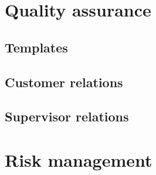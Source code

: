 \section{Quality assurance}
\subsection{Templates}

\subsection{Customer relations}
\subsection{Supervisor relations}

\section{Risk management}
